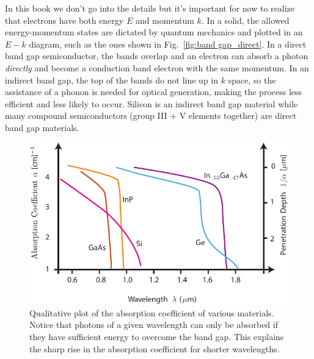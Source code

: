 In this book we don't go into the details but it's important for now to realize that electrons have both energy $E$ and momentum $k$.  In a solid, the allowed energy-momentum states are dictated by quantum mechanics and plotted in an $E-k$ diagram, such as the ones shown in Fig.~\ref{fig:band gap_direct}.  In a direct band gap semiconductor, the bands overlap and an electron can absorb a photon \emph{directly} and become a conduction band electron with the same momentum.   In an indirect band gap, the top of the bands do not line up in $k$ space, so the assistance of a phonon is needed for optical generation, making the process less efficient and less likely to occur.  Silicon is an indirect band gap material while many compound semiconductors (group III + V elements together) are direct band gap materials.
\begin{figure}[tb]
\begin{center}
\includegraphics[width=.75\columnwidth]{semi_absorb_photon}
\end{center}
\caption{Qualitative plot of the absorption coefficient of various materials.  Notice that photons of a given wavelength can only be absorbed if they have sufficient energy to overcome the band gap.  This explains the sharp rise in the absorption coefficient for shorter wavelengths.} \label{fig:semi_absorb_photon}
\end{figure}

